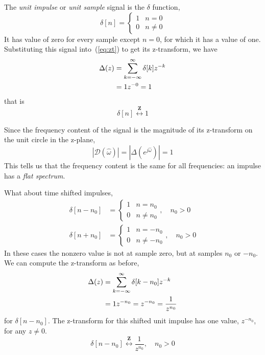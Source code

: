 The \emph{unit impulse} or \emph{unit sample} signal is the $\delta$
function,
\begin{equation}
\delta[n] = \left\{\begin{array}{ll}
                        1 & n=0 \\
                        0 & n \neq 0
          \end{array}\right.
\end{equation}
It has value of zero for every sample except $n=0$, for which it has a
value of one. Substituting this signal into~(\ref{eq:zt}) to get its
z-transform, we have
\begin{align}
\Delta(z) &= \sum_{k=-\infty}^{\infty} \delta[k] z^{-k} \notag\\
     &= 1z^{-0}=1
\end{align}
that is 
\begin{equation}
\delta[n]\stackrel{\mathbf{Z}}{\longleftrightarrow} 1
\end{equation}

Since the frequency content of the signal is the magnitude of its
z-transform on the unit circle in the z-plane, 
\begin{equation}
|\mathcal{D}(\hat{\omega})|=|\Delta(e^{j\hat{\omega}})|=1
\label{eq:zt-delta}
\end{equation}
This tells us that the frequency content is the same for all
frequencies: an impulse has a \emph{flat spectrum}.

What about time shifted impulses,
\begin{align}
\delta[n-n_0] &= \left\{\begin{array}{ll}
                        1 & n=n_0 \\
                        0 & n \neq n_0
          \end{array}\right., \quad n_0>0 \\
\delta[n+n_0] &= \left\{\begin{array}{ll}
                        1 & n=-n_0 \\
                        0 & n \neq -n_0
          \end{array}\right., \quad n_0>0
\end{align}
In these cases the nonzero value is not at sample zero, but at samples
$n_0$ or $-n_0$.  We can compute the z-transform as before,
\begin{align}
\Delta(z) &= \sum_{k=-\infty}^{\infty} \delta[k-n_0] z^{-k} \notag\\
          &= 1z^{-n_0}=z^{-n_0}=\frac{1}{z^{n_0}}
\end{align}
for $\delta[n-n_0]$.  The z-transform for this shifted unit impulse
has one value, $z^{-n_0}$, for any $z \neq 0$.
\begin{equation}
\delta[n-n_0] \stackrel{\mathbf{Z}}{\longleftrightarrow} \frac{1}{z^{n_0}},
\quad n_0>0
\end{equation}

